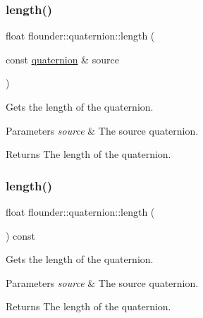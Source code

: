 \subsubsection{\texorpdfstring{length()}{length()}\hspace{0.1cm}{\footnotesize\ttfamily [1/2]}}
{\footnotesize\ttfamily float flounder\+::quaternion\+::length (\begin{DoxyParamCaption}\item[{const \hyperlink{classflounder_1_1quaternion}{quaternion} \&}]{source }\end{DoxyParamCaption})\hspace{0.3cm}{\ttfamily [static]}}



Gets the length of the quaternion. 


\begin{DoxyParams}{Parameters}
{\em source} & The source quaternion. \\
\hline
\end{DoxyParams}
\begin{DoxyReturn}{Returns}
The length of the quaternion. 
\end{DoxyReturn}
\mbox{\label{classflounder_1_1quaternion_a850de24f502de1071f91927866a9e966}} 
\subsubsection{\texorpdfstring{length()}{length()}\hspace{0.1cm}{\footnotesize\ttfamily [2/2]}}
{\footnotesize\ttfamily float flounder\+::quaternion\+::length (\begin{DoxyParamCaption}{ }\end{DoxyParamCaption}) const}



Gets the length of the quaternion. 


\begin{DoxyParams}{Parameters}
{\em source} & The source quaternion. \\
\hline
\end{DoxyParams}
\begin{DoxyReturn}{Returns}
The length of the quaternion. 
\end{DoxyReturn}
\mbox{\label{classflounder_1_1quaternion_a5e67f0dc71eeefd2b76788df0157cbd0}} 
